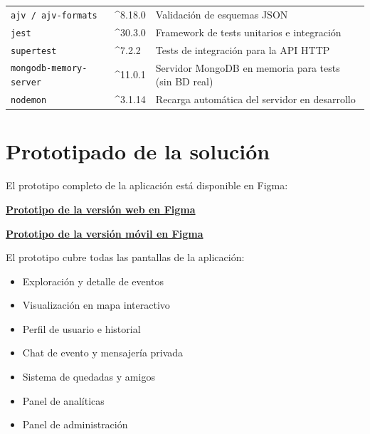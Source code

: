 \documentclass[12pt, a4paper]{article}
\begin{document}
\begin{center}
\begin{longtable}{p{4.2cm} p{1.8cm} p{7.5cm}}
  \texttt{ajv / ajv-formats}    & \^{}8.18.0 & Validación de esquemas JSON \\
  \texttt{jest}                  & \^{}30.3.0  & Framework de tests unitarios e integración \\
  \texttt{supertest}             & \^{}7.2.2   & Tests de integración para la API HTTP \\
  \texttt{mongodb-memory-server} & \^{}11.0.1  & Servidor MongoDB en memoria para tests (sin BD real) \\
  \texttt{nodemon}               & \^{}3.1.14  & Recarga automática del servidor en desarrollo \\
  \bottomrule
\end{longtable}
\end{center}

\section{Prototipado de la solución}

El prototipo completo de la aplicación está disponible en Figma:

\begin{center}
  \textbf{\textcolor{primary}{\href{https://www.figma.com/design/TfRqhXv41VX0Toq1gj84KK/EventConnect?node-id=0-1&t=e7v9mcGCSKsCXTvy-1}{Prototipo de la versión web en Figma}}}
\end{center}

\begin{center}
  \textbf{\textcolor{primary}{\href{https://www.figma.com/design/v0OXOjUJ2Dfx8RJBapv4A1/EventConnect-movil?node-id=1-2&t=tOttEwtRHJ7NRy7p-0}{Prototipo de la versión móvil en Figma}}}
\end{center}

El prototipo cubre todas las pantallas de la aplicación:
\begin{itemize}[leftmargin=1.4em]
  \item Exploración y detalle de eventos
  \item Visualización en mapa interactivo
  \item Perfil de usuario e historial
  \item Chat de evento y mensajería privada
  \item Sistema de quedadas y amigos
  \item Panel de analíticas
  \item Panel de administración
\end{itemize}
\end{document}
